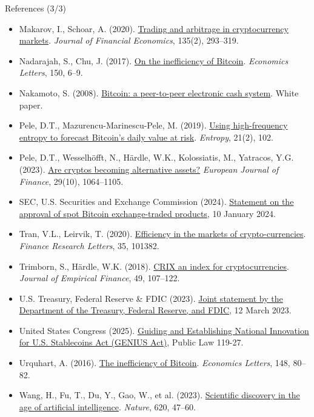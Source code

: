 \begin{frame}{References (3/3)}
\itemsize{\tiny}
\begin{itemize}
    \item Makarov, I., Schoar, A. (2020). \href{https://doi.org/10.1016/j.jfineco.2019.07.001}{Trading and arbitrage in cryptocurrency markets}. \textit{Journal of Financial Economics}, 135(2), 293--319.
    \item Nadarajah, S., Chu, J. (2017). \href{https://doi.org/10.1016/j.econlet.2016.10.033}{On the inefficiency of Bitcoin}. \textit{Economics Letters}, 150, 6--9.
    \item Nakamoto, S. (2008). \href{https://bitcoin.org/bitcoin.pdf}{Bitcoin: a peer-to-peer electronic cash system}. White paper.
    \item Pele, D.T., Mazurencu-Marinescu-Pele, M. (2019). \href{https://doi.org/10.3390/e21020102}{Using high-frequency entropy to forecast Bitcoin's daily value at risk}. \textit{Entropy}, 21(2), 102.
    \item Pele, D.T., Wesselhöfft, N., Härdle, W.K., Kolossiatis, M., Yatracos, Y.G. (2023). \href{https://doi.org/10.1080/1351847X.2021.1960403}{Are cryptos becoming alternative assets?} \textit{European Journal of Finance}, 29(10), 1064--1105.
    \item SEC, U.S. Securities and Exchange Commission (2024). \href{https://www.sec.gov/newsroom/speeches-statements/gensler-statement-spot-bitcoin-011023}{Statement on the approval of spot Bitcoin exchange-traded products}, 10 January 2024.
    \item Tran, V.L., Leirvik, T. (2020). \href{https://doi.org/10.1016/j.frl.2019.101382}{Efficiency in the markets of crypto-currencies}. \textit{Finance Research Letters}, 35, 101382.
    \item Trimborn, S., Härdle, W.K. (2018). \href{https://doi.org/10.1016/j.jempfin.2018.08.004}{CRIX an index for cryptocurrencies}. \textit{Journal of Empirical Finance}, 49, 107--122.
    \item U.S. Treasury, Federal Reserve \& FDIC (2023). \href{https://www.federalreserve.gov/newsevents/pressreleases/monetary20230312b.htm}{Joint statement by the Department of the Treasury, Federal Reserve, and FDIC}, 12 March 2023.
    \item United States Congress (2025). \href{https://www.govinfo.gov/app/details/PLAW-119publ27}{Guiding and Establishing National Innovation for U.S. Stablecoins Act (GENIUS Act)}, Public Law 119-27.
    \item Urquhart, A. (2016). \href{https://doi.org/10.1016/j.econlet.2016.09.019}{The inefficiency of Bitcoin}. \textit{Economics Letters}, 148, 80--82.
    \item Wang, H., Fu, T., Du, Y., Gao, W., et al. (2023). \href{https://doi.org/10.1038/s41586-023-06221-2}{Scientific discovery in the age of artificial intelligence}. \textit{Nature}, 620, 47--60.
\end{itemize}
\end{frame}


